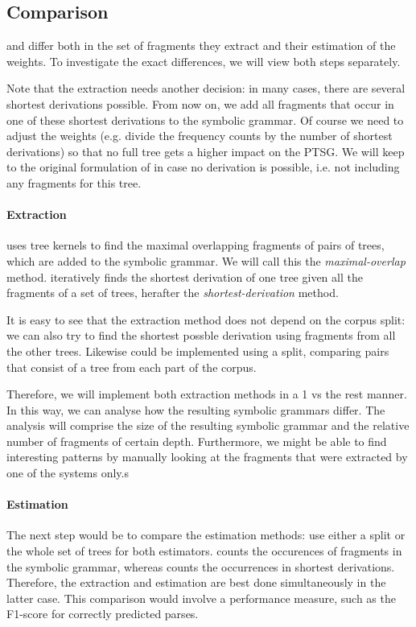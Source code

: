 \subsection{Comparison}
\dops{} and \ddop{} differ both in the set of fragments they extract and their estimation of the weights. To investigate the exact differences, we will view both steps separately.

Note that the \dops{} extraction needs another decision: in many cases, there are several shortest derivations possible. From now on, we add all fragments that occur in one of these shortest derivations to the symbolic grammar. Of course we need to adjust the weights (e.g. divide the frequency counts by the number of shortest derivations) so that no full tree gets a higher impact on the PTSG. We will keep to the original formulation of \dops{} in case no derivation is possible, i.e. not including any fragments for this tree.

\paragraph{Extraction}
\ddop{} uses tree kernels to find the maximal overlapping fragments of pairs of trees, which are added to the symbolic grammar. We will call this the \emph{maximal-overlap} method. \dops{} iteratively finds the shortest derivation of one tree given all the fragments of a set of trees, herafter the \emph{shortest-derivation} method. 

It is easy to see that the \dops{} extraction method does not depend on the corpus split: we can also try to find the shortest possble derivation using fragments from all the other trees. Likewise \ddop{} could be implemented using a split, comparing pairs that consist of a tree from each part of the corpus. 

Therefore, we will implement both extraction methods in a 1 vs the rest manner. In this way, we can analyse how the resulting symbolic grammars differ. The analysis will comprise the size of the resulting symbolic grammar and the relative number of fragments of certain depth. Furthermore, we might be able to find interesting patterns by manually looking at the fragments that were extracted by one of the systems only.s

\paragraph{Estimation}
The next step would be to compare the estimation methods: use either a split or the whole set of trees for both estimators. \ddop{} counts the occurences of fragments in the symbolic grammar, whereas \dops{} counts the occurrences in shortest derivations. Therefore, the extraction and estimation are best done simultaneously in the latter case. This comparison would involve a performance measure, such as the F1-score for correctly predicted parses.


